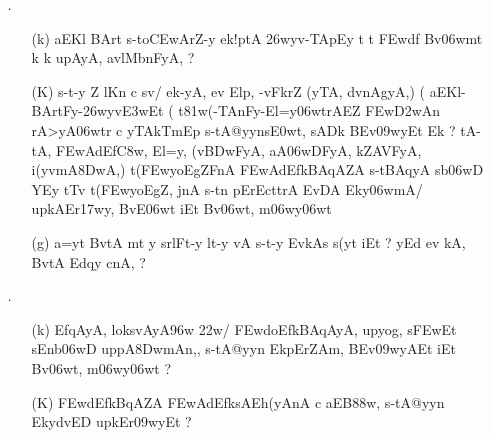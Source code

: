 \def\DevnagVersion{2.15}\documentclass{article}
\begin{document}
\begin{itemize}
 \item[{\dn \dnnum \rn{7}}.] \begin{itemize}
          
          \item[({\dn k})]  {\dn aEKl\? BArt\? s\2-to\3CEwArZ-y ek!ptA\2 \326wyv-TApEy\2 t\? t\? \3FEwd\?f\? Bv\306wmt\? k\? k\? upAyA, avlMbnFyA, {\rs ?\re}} 
          
          \item[({\dn K})] {\dn s\2-t-y Z\? l\?Kn\? c sv\0/ ek-yA, ev Elp\?, -vFkrZ\2 {\rs (\re}yTA{\rs ,\re} d\?vnAgyA\0,{\rs )\re} {\rs (\re}\dn\dnnum {}  aEKl{\rs -\re}BArtFy{\rs -\re}\326wyv\3E3wEt {\rs (\re}\dn\dnnum {} t\381w(-TAnFy{\rs -\re}El=y\306wtrAEZ \3FEw\3D2wAn\? rA>yA\306wtr\? c yTAkTmEp s\2-tA@yyns\3E0wt\?, sADk\2 BEv\309wyEt Ek {\rs ?\re} tA-tA, \3FEwAd\?Ef\3C8w, El=y, {\rs (\re}v\3BDwFyA{\rs ,\re} aA\306wD\5FyA{\rs ,\re} kZA\0VFyA{\rs ,\re} i(y\?vmA\38DwA,{\rs )\re} t(\3FEwyoEgZFnA\2 \3FEwAd\?EfkBAqAZA\2 s\2-tBAqyA s\2b\306wD\2 YEy tT\4v t(\3FEwyoEgZ, jnA s\2-t\?n pErEcttrA EvDA Eky\306wmA/ upkAEr\317wy, BvE\306wt iEt Bv\306wt, m\306wy\306wt}
          
          \item[({\dn g})] {\dn a=y\?t BvtA\2 mt y srlFt-y lt-y vA s\2-t-y EvkAs\2 s\2(y\4t iEt {\rs ?\re} yEd ev kA, BvtA\2 Edqy\? cnA, {\rs ?\re}}
          
          \end{itemize}                                         
          
   \item[{\dn \dnnum \rn{8}}.]  \begin{itemize}
   
               \item[({\dn k})] {\dn EfqAyA, loks\?vAyA\396w \322w\?/\?{\rs ,\re} \3FEwdoEfkBAqAyA, upyog, s\2\3FEwEt sEnb\0\306wD uppA\38DwmAn,{\rs ,\re} s\2-tA@yyn\? Ek\2pErZAm, BEv\309wyAEt iEt Bv\306wt, m\306wy\306wt\? {\rs ?\re}}  
              
              \item[({\dn K})] {\dn \3FEwd\?EfkBqAZA\2 \3FEwAd\?EfksAEh(yAnA\2 c aEB\388w\?, s\2-tA@yyn\2 EkydvED upkEr\309wyEt {\rs ?\re} }
              

\end{itemize}
\end{itemize}
\end{document}
